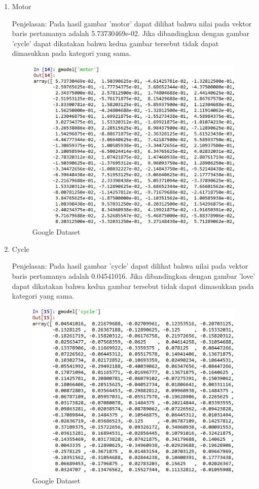 \begin{enumerate}
\begin{enumerate}
\item Motor

Penjelasan: Pada hasil gambar 'motor' dapat dilihat bahwa nilai pada vektor baris pertamanya adalah 5.73730469e-02. Jika dibandingkan dengan gambar 'cycle' dapat dikatakan bahwa kedua gambar tersebut tidak dapat dimasukkan pada kategori yang sama.

\begin{figure}[!hbtp]
\centering
\includegraphics[scale=0.7]{figures/1174031/5/21motor.jpg}
\caption{Google Dataset}
\label{Google Dataset}
\end{figure}

\item Cycle

Penjelasan: Pada hasil gambar 'cycle' dapat dilihat bahwa nilai pada vektor baris pertamanya adalah 0.04541016. Jika dibandingkan dengan gambar 'love' dapat dikatakan bahwa kedua gambar tersebut tidak dapat dimasukkan pada kategori yang sama.

\begin{figure}[!hbtp]
\centering
\includegraphics[scale=0.7]{figures/1174031/5/22cycle.jpg}
\caption{Google Dataset}
\label{Google Dataset}
\end{figure}


\end{enumerate}
\end{enumerate}
